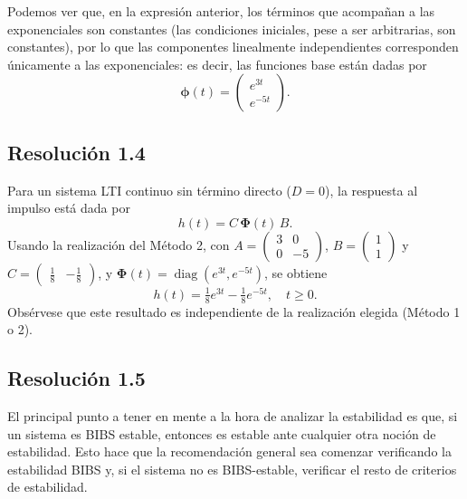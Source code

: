 \documentclass[
  11pt,
  letterpaper,
   addpoints,
   answers
  ]{exam}
\begin{document}
\begin{questions}
\begin{solution}
Podemos ver que, en la expresión anterior, los términos que acompañan a las exponenciales
son constantes (las condiciones iniciales, pese a ser arbitrarias, son constantes), por lo que las componentes
linealmente independientes corresponden únicamente a las exponenciales: es decir, las funciones
base están dadas por
\begin{equation}
\boldsymbol{\phi}(t)=
\begin{pmatrix}
e^{3t}\\
e^{-5t}
\end{pmatrix}.
\end{equation}
\subsection*{Resolución 1.4}
Para un sistema LTI continuo sin término directo ($D=0$), la respuesta al impulso está dada por
\begin{equation}
  h(t) = C\,\boldsymbol{\Phi}(t)\,B.
\end{equation}
Usando la realización del Método 2, con
$A=\begin{pmatrix}3&0\\0&-5\end{pmatrix}$, $B=\begin{pmatrix}1\\1\end{pmatrix}$ y
$C=\begin{pmatrix}\tfrac{1}{8} & -\tfrac{1}{8}\end{pmatrix}$, y
$\boldsymbol{\Phi}(t)=\operatorname{diag}(e^{3t},e^{-5t})$, se obtiene
\begin{equation}
  h(t) = \tfrac{1}{8}e^{3t} - \tfrac{1}{8}e^{-5t},\quad t\ge 0.
\end{equation}
Obsérvese que este resultado es independiente de la realización elegida (Método 1 o 2).
\subsection*{Resolución 1.5}
El principal punto a tener en mente a la hora de analizar la estabilidad es que, si un sistema es BIBS estable, entonces es estable ante cualquier otra noción de estabilidad. Esto hace que la recomendación general sea comenzar verificando la estabilidad BIBS y, si el sistema no es BIBS-estable, verificar el resto de criterios de estabilidad.


\end{solution}
\end{questions}
\end{document}

